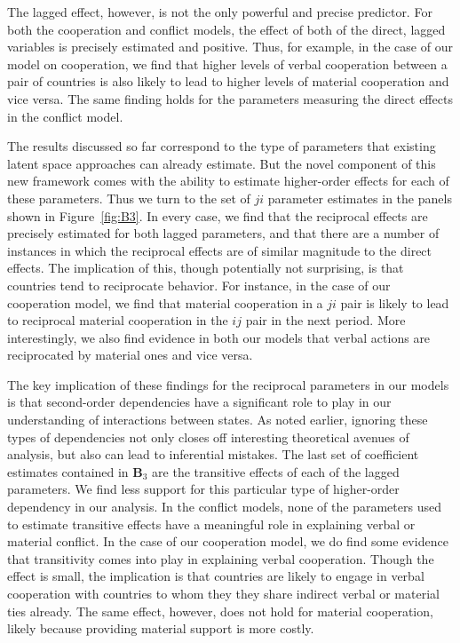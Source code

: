 \documentclass[3p,times,twocolumn,authoryear,12pt]{elsarticle}
\newcommand{\bl}[1]{{\mathbf #1}}
\begin{document}
The lagged effect, however, is not the only powerful and precise predictor. For both the cooperation and conflict models, the effect of both of the direct, lagged variables is precisely estimated and positive. Thus, for example, in the case of our model on cooperation, we find that higher levels of verbal cooperation between a pair of countries is also likely to lead to higher levels of material cooperation and vice versa. The same finding holds for the parameters measuring the direct effects in the conflict model.

The results discussed so far correspond to the type of parameters that existing latent space approaches can already estimate. But the novel component of this new framework comes with the ability to estimate higher-order effects for each of these parameters. Thus we turn to the set of $ji$ parameter estimates in the panels shown in Figure~\ref{fig:B3}. In every case, we find that the reciprocal effects are precisely estimated for both lagged parameters, and that there are a number of instances in which the reciprocal effects are of similar magnitude to the direct effects. The implication of this, though potentially not surprising, is that countries tend to reciprocate behavior. For instance, in the case of our cooperation model, we find that material cooperation in a $ji$ pair is likely to lead to reciprocal material cooperation in the $ij$ pair in the next period. More interestingly, we also find evidence in both our models that verbal actions are reciprocated by material ones and vice versa. 

The key implication of these findings for the reciprocal parameters in our models is that second-order dependencies have a significant role to play in our understanding of interactions between states. As noted earlier, ignoring these types of dependencies not only closes off interesting theoretical avenues of analysis, but also can lead to inferential mistakes. The last set of coefficient estimates contained in $\bl B_3$  are the transitive effects of each of the lagged parameters. We find less support for this particular type of higher-order dependency in our analysis. In the conflict models, none of the parameters used to estimate transitive effects have a meaningful role in explaining verbal or material conflict. In the case of our cooperation model, we do find some evidence that transitivity comes into play in explaining verbal cooperation. Though the effect is small, the implication is that countries are likely to engage in verbal cooperation with countries to whom they they share indirect verbal or material ties already. The same effect, however, does not hold for material cooperation, likely because providing material support is more costly. 
\end{document}
